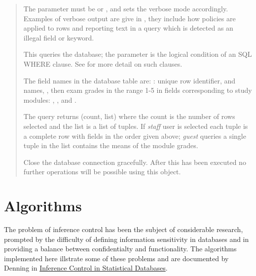 \documentclass[a4paper,11pt,english]{sphinxmanual}
\begin{document}
\begin{fulllineitems}
\begin{quote}
The parameter must be  or , and sets the verbose mode accordingly. Examples of
verbose output are give in {\hyperref[algorithms:ref\string-algorithms]{}}, they include how policies are applied to rows
and reporting text in a query which is detected as an illegal field or keyword.

\begin{fulllineitems}
\label{reference:dbinfer.DbInfer.query}
\end{fulllineitems}


This queries the database; the parameter is the logical condition of an SQL WHERE clause. See
{\hyperref[examples:ref\string-examples]{}} for more detail on such clauses.

The field names in the database table are: : unique row identifier,  and
 names, , then exam grades in the range 1-5 in fields corresponding to study modules:
, ,  and .

The query returns (count, list) where the count is the number of rows selected and the list is a
list of tuples. If \emph{staff} user is selected each tuple is a complete row with fields in the order given above;
\emph{guest} queries a single tuple in the list contains the means of the module grades.

\begin{fulllineitems}
\label{reference:dbinfer.DbInfer.close}
\end{fulllineitems}


Close the database connection gracefully. After this has been executed no further operations will
be possible using this object.
\end{quote}

\end{fulllineitems}



\chapter{Algorithms}
\label{algorithms:ref-algorithms}\label{algorithms:algorithms}\label{algorithms::doc}
The problem of inference control has been the subject of considerable research,
prompted by the difficulty of defining information sensitivity in databases and
in providing a balance between confidentialty and functionality. The algorithms
implemented here illstrate some of these problems and are documented by Denning
in \href{http://ieeexplore.ieee.org/xpl/login.jsp?tp=\&arnumber=1654444\&url=http\%3A\%2F\%2Fieeexplore.ieee.org\%2Fiel5\%2F2\%2F34683\%2F01654444.pdf\%3Farnumber\%3D1654444}{Inference Control in Statistical Databases}.
\end{document}

